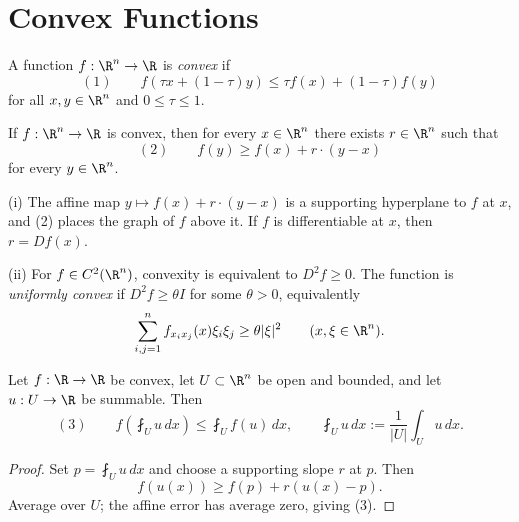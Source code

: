 
\section{Convex Functions}
\label{sec:convex-functions}

\begin{definition}
\label{def:convex-function-rn}
A function $f:\R^n\to\R$ is \textit{convex} if
\[
(1)\qquad
f(\tau x+(1-\tau)y)
\leq \tau f(x)+(1-\tau)f(y)
\]
for all $x,y\in\R^n$ and $0\leq\tau\leq1$.
\end{definition}

\begin{theorem}
\label{thm:supporting-hyperplanes}

If $f:\R^n\to\R$ is convex, then for every $x\in\R^n$ there exists $r\in\R^n$ such that
\[
(2)\qquad f(y)\geq f(x)+r\cdot(y-x)
\]
for every $y\in\R^n$.
\end{theorem}

\begin{remark}
\label{rem:supporting-hyperplane-remarks}

(i) The affine map $y\mapsto f(x)+r\cdot(y-x)$ is a supporting hyperplane to $f$ at $x$, and (2) places the graph of $f$ above it. If $f$ is differentiable at $x$, then $r=Df(x)$.

(ii) For $f\in C^2(\R^n)$, convexity is equivalent to $D^2f\geq0$. The function is \textit{uniformly convex} if $D^2f\geq\theta I$ for some $\theta>0$, equivalently
\[
\sum_{i,j=1}^n f_{x_ix_j}(x)\xi_i\xi_j
\geq\theta|\xi|^2
\qquad(x,\xi\in\R^n).
\]
\end{remark}

\begin{theorem}
\label{thm:jensens-inequality}

Let $f:\R\to\R$ be convex, let $U\subset\R^n$ be open and bounded, and let $u:U\to\R$ be summable. Then
\[
(3)\qquad
f\left(\fint_Uu\,dx\right)
\leq\fint_Uf(u)\,dx,
\qquad
\fint_Uu\,dx:=\frac1{|U|}\int_Uu\,dx.
\]
\end{theorem}
\begin{proof}
\sketch Set $p=\fint_Uu\,dx$ and choose a supporting slope $r$ at $p$. Then
\[
f(u(x))\geq f(p)+r(u(x)-p).
\]
Average over $U$; the affine error has average zero, giving (3).
\end{proof}


